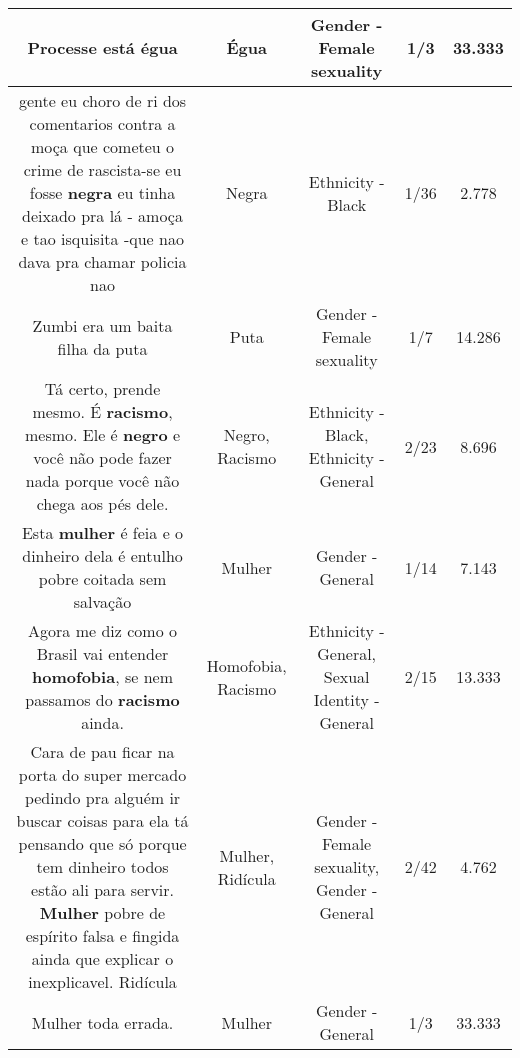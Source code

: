 \documentclass[11pt]{article}
\newlength\mylength
\begin{document}
\begin{center}
\begin{longtable}{|C{.65\mylength}|C{.30\mylength}|C{.12\mylength}|C{.12\mylength}|C{.12\mylength}|}
  \small Processe está égua\normalsize   & Égua & Gender - Female sexuality & 1/3 & 33.333 \\  \hline
  \small gente eu choro de ri dos comentarios contra a moça que cometeu o crime de rascista-se eu fosse \textbf{negra} eu tinha deixado pra lá - amoça e tao isquisita -que nao dava pra chamar policia nao\normalsize   & Negra & Ethnicity - Black & 1/36 & 2.778 \\  \hline
  \small Zumbi era um baita filha da puta\normalsize   & Puta & Gender - Female sexuality & 1/7 & 14.286 \\  \hline
  \small Tá certo, prende mesmo. É \textbf{racismo}, mesmo. Ele é \textbf{negro} e você não pode fazer nada porque você não chega aos pés dele.\normalsize   & Negro, Racismo & Ethnicity - Black, Ethnicity - General & 2/23 & 8.696 \\  \hline
  \small Esta \textbf{mulher} é feia e o dinheiro dela é entulho pobre coitada sem salvação\normalsize   & Mulher & Gender - General & 1/14 & 7.143 \\  \hline
  \small Agora me diz como o Brasil vai entender \textbf{homofobia}, se nem passamos do \textbf{racismo} ainda.\normalsize   & Homofobia, Racismo & Ethnicity - General, Sexual Identity - General & 2/15 & 13.333 \\  \hline
  \small Cara de pau ficar na porta do super mercado pedindo pra alguém ir buscar coisas para ela tá pensando que só porque tem dinheiro todos estão ali para servir. \textbf{Mulher} pobre de espírito falsa e fingida ainda que explicar o inexplicavel. Ridícula\normalsize   & Mulher, Ridícula & Gender - Female sexuality, Gender - General & 2/42 & 4.762 \\  \hline
  \small Mulher toda errada.\normalsize   & Mulher & Gender - General & 1/3 & 33.333 \\  \hline

\end{longtable}
\end{center}
\end{document}
